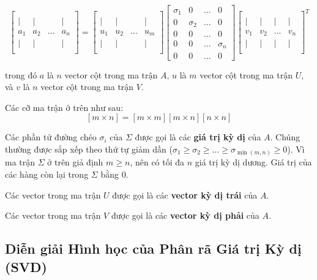 \[
\begin{bmatrix}
 &  &  &  \\
| & | &  & |\\
a_{1} & a_{2} & ... & a_{n} \\
| & | &  & |\\
 &  &  &
\end{bmatrix}=\begin{bmatrix}
 &  &  &  \\
| & | &  & |\\
u_{1} & u_{2} & ... & u_{m} \\
| & | &  & |\\
 &  &  &
\end{bmatrix}\begin{bmatrix}
\sigma_{1} & 0 & ... & 0 \\
0 & \sigma_{2} & ... & 0 \\
0 & 0 & ... & 0 \\
0 & 0 & ... & \sigma_{n} \\
0 & 0 & ... & 0
\end{bmatrix}\begin{bmatrix}
 &  &  &  \\
| & | & | & | \\
v_{1} & v_{2} & ... & v_{n} \\
| & | & | & | \\
 &  &  &
\end{bmatrix}^{T}
\]

trong đó $a$ là $n$ vector cột trong ma trận $A$, $u$ là $m$ vector cột trong ma trận $U$, và $v$ là $n$ vector cột trong ma trận $V$.

Các cỡ ma trận ở trên như sau:
\[
\left[ m\times n \right]=\left[ m\times m \right]\left[ m\times n \right]\left[ n\times n \right]
\]

Các phần tử đường chéo $\sigma_{i}$ của $\Sigma$ được gọi là các \textbf{giá trị kỳ dị} của $A$. Chúng thường được sắp xếp theo thứ tự giảm dần ($\sigma_{1} \geq \sigma_{2} \geq ... \geq \sigma_{\min(m,n)} \geq 0$). Vì ma trận $\Sigma$ ở trên giả định $m \ge n$, nên có tối đa $n$ giá trị kỳ dị dương. Giá trị của các hàng còn lại trong $\Sigma$ bằng 0.

Các vector trong ma trận $U$ được gọi là các \textbf{vector kỳ dị trái} của $A$.

Các vector trong ma trận $V$ được gọi là các \textbf{vector kỳ dị phải} của $A$.

\subsection{Diễn giải Hình học của Phân rã Giá trị Kỳ dị (SVD)}

